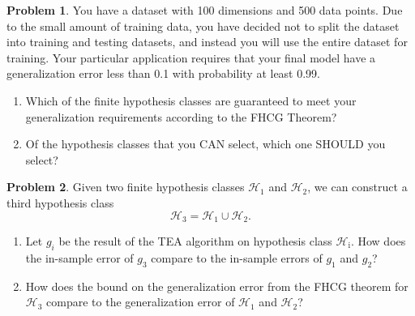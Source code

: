 \documentclass[10pt]{exam}
\theoremstyle{definition}
\newtheorem{problem}{Problem}
\newtheorem{theorem}{Theorem}
\DeclareMathOperator{\prob}{\mathbb P}
\newcommand{\HH}[1]{\mathcal H_{\text{#1}}}
\begin{document}
\newpage
\begin{problem}
    You have a dataset with 100 dimensions and 500 data points.
    Due to the small amount of training data, you have decided not to split the dataset into training and testing datasets,
    and instead you will use the entire dataset for training.
    Your particular application requires that your final model have a generalization error less than 0.1 with probability at least 0.99.
    \begin{enumerate}
        \item
    Which of the finite hypothesis classes are guaranteed to meet your generalization requirements according to the FHCG Theorem?

            \vspace{4in}
\item
    Of the hypothesis classes that you CAN select, which one SHOULD you select?
    \end{enumerate}

\end{problem}


\newpage
\begin{problem}
    Given two finite hypothesis classes $\HH{1}$ and $\HH{2}$, we can construct a third hypothesis class
    \begin{equation}
        \HH{3} = \HH{1} \cup \HH{2}.
    \end{equation}
    \begin{enumerate}
        \item
            Let $g_i$ be the result of the TEA algorithm on hypothesis class $\HH{i}$.
            How does the in-sample error of $g_3$ compare to the in-sample errors of $g_1$ and $g_2$?

            \vspace{4in}
        \item
            How does the bound on the generalization error from the FHCG theorem for $\HH{3}$ compare to the generalization error of $\HH{1}$ and $\HH{2}$?
    \end{enumerate}
\end{problem}
\end{document}
